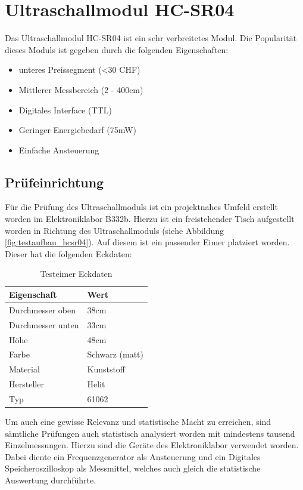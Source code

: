 \section{Ultraschallmodul HC-SR04} \label{sec:hc-sr04}
Das Ultraschallmodul HC-SR04 ist ein sehr verbreitetes Modul. Die Popularität
dieses Moduls ist gegeben durch die folgenden Eigenschaften:
\begin{itemize}
	\item unteres Preissegment (<30 CHF)
	\item Mittlerer Messbereich (2 - 400cm)
	\item Digitales Interface (TTL)
	\item Geringer Energiebedarf (75mW)
	\item Einfache Ansteuerung
\end{itemize}

\subsection{Prüfeinrichtung}
Für die Prüfung des Ultraschallmoduls ist ein projektnahes Umfeld erstellt 
worden im Elektroniklabor B332b. Hierzu ist ein freistehender Tisch 
aufgestellt worden in Richtung des Ultraschallmoduls (siehe Abbildung 
\ref{fig:testaufbau_hcsr04}). Auf diesem ist ein passender Eimer platziert
worden. Dieser hat die folgenden Eckdaten:

\begin{table}[h!]
	\centering
	\begin{tabular}{l l}
		Eigenschaft		& Wert \\
		\hline
		Durchmesser oben	& 38cm \\
		Durchmesser unten	& 33cm \\
		Höhe 			& 48cm \\
		Farbe 			& Schwarz (matt) \\
		Material		& Kunststoff \\
		Hersteller		& Helit \\
		Typ			& 61062
	\end{tabular}
	\caption{Testeimer Eckdaten}
	\label{tab:testeimer}
\end{table}

Um auch eine gewisse Relevanz und statistische Macht zu erreichen, sind 
sämtliche Prüfungen auch statistisch analysiert worden mit mindestens tausend
Einzelmessungen. Hierzu sind die Geräte des Elektroniklabor verwendet worden.
Dabei diente ein Frequenzgenerator als Ansteuerung und ein Digitales 
Speicheroszilloskop als Messmittel, welches auch gleich die statistische
Auswertung durchführte.

